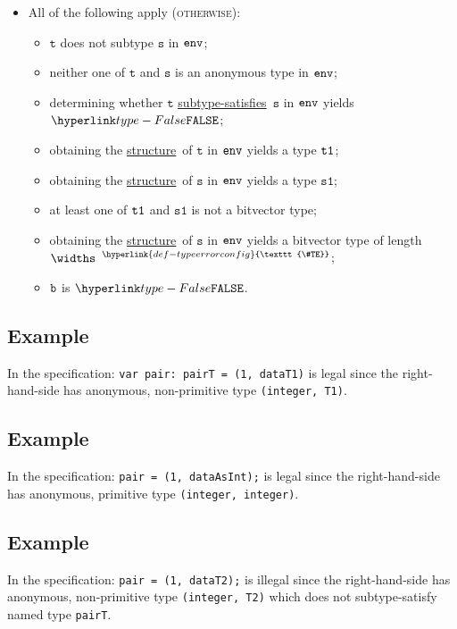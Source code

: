 \documentclass{book}
\newcommand\TypeErrorConfig[0]{\hyperlink{def-typeerrorconfig}{\texttt{\#TE}}}
\newcommand\ProseOrTypeError[0]{\hyperlink{def-proseortypeerror}{$^{\TypeErrorConfig}$}}
\newcommand\structure[0]{\hyperlink{def-structure}{structure}}
\newcommand\subtypesatisfies[0]{\hyperlink{def-subtypesatisfies}{subtype-satisfies}}
\newcommand\vt[0]{\texttt{t}}
\newcommand\vs[0]{\texttt{s}}
\newcommand\vsone[0]{\texttt{s1}}
\begin{document}
\begin{itemize}
  \item All of the following apply (\textsc{otherwise}):
  \begin{itemize}
    \item $\vt$ does not subtype $\vs$ in $\texttt{env}$;
    \item neither one of $\vt$ and $\vs$ is an anonymous type in $\texttt{env}$;
    \item determining whether $\vt$ \subtypesatisfies\ $\vs$ in $\texttt{env}$ yields $\False$;
    \item obtaining the \structure\ of $\vt$ in $\texttt{env}$ yields a type $\texttt{t1}$;
    \item obtaining the \structure\ of $\vs$ in $\texttt{env}$ yields a type $\vsone$;
    \item at least one of $\texttt{t1}$ and $\vsone$ is not a bitvector type;
    \item obtaining the \structure\ of $\vs$ in $\texttt{env}$ yields a bitvector type of length $\widths$ \ProseOrTypeError;
    \item $\texttt{b}$ is $\False$.
  \end{itemize}
\end{itemize}

\subsection{Example}
In the specification:
\texttt{var pair: pairT = (1, dataT1)} is legal since the right-hand-side has
anonymous, non-primitive type \texttt{(integer, T1)}.

\subsection{Example}
In the specification:
\texttt{pair = (1, dataAsInt);} is legal since the right-hand-side has anonymous,
primitive type \texttt{(integer, integer)}.

\subsection{Example}
In the specification:
\texttt{pair = (1, dataT2);} is illegal since the right-hand-side has anonymous,
non-primitive type \texttt{(integer, T2)} which does not subtype-satisfy named
type \texttt{pairT}.
\end{document}
